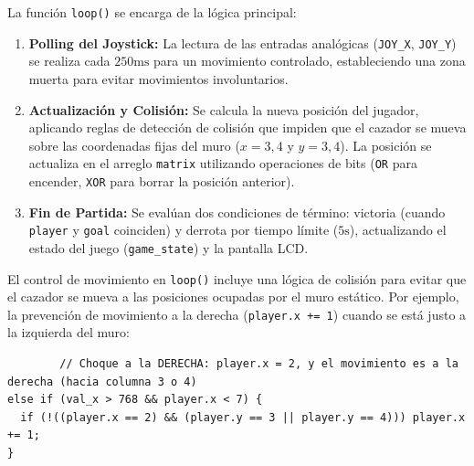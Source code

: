 La función \texttt{loop()} se encarga de la lógica principal:

\vspace{1em}
\begin{enumerate}
    \item \textbf{Polling del Joystick:} La lectura de las entradas analógicas (\texttt{JOY\_X}, \texttt{JOY\_Y}) se realiza cada $250\text{ms}$ para un movimiento controlado, estableciendo una zona muerta para evitar movimientos involuntarios.
    \item \textbf{Actualización y Colisión:} Se calcula la nueva posición del jugador, aplicando reglas de detección de colisión que impiden que el cazador se mueva sobre las coordenadas fijas del muro ($x=3, 4$ y $y=3, 4$). La posición se actualiza en el arreglo \texttt{matrix} utilizando operaciones de bits (\texttt{OR} para encender, \texttt{XOR} para borrar la posición anterior).
    \item \textbf{Fin de Partida:} Se evalúan dos condiciones de término: victoria (cuando \texttt{player} y \texttt{goal} coinciden) y derrota por tiempo límite ($5\text{s}$), actualizando el estado del juego (\texttt{game\_state}) y la pantalla LCD.
\end{enumerate}

El control de movimiento en \texttt{loop()} incluye una lógica de colisión para evitar que el cazador se mueva a las posiciones ocupadas por el muro estático. Por ejemplo, la prevención de movimiento a la derecha (\texttt{player.x += 1}) cuando se está justo a la izquierda del muro:

    \begin{verbatim}
        // Choque a la DERECHA: player.x = 2, y el movimiento es a la derecha (hacia columna 3 o 4)
else if (val_x > 768 && player.x < 7) { 
  if (!((player.x == 2) && (player.y == 3 || player.y == 4))) player.x += 1;
}
    \end{verbatim}


